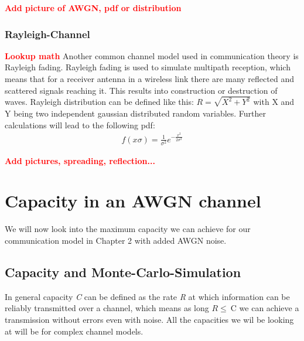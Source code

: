 \documentclass[12pt,oneside, reqno]{report}
\newcommand\boldred[1]{\textcolor{red}{\textbf{#1}}}
\begin{document}
\boldred{Add picture of AWGN, pdf or distribution}

\subsection{Rayleigh-Channel}
\boldred{Lookup math}
Another common channel model used in communication theory is Rayleigh fading. Rayleigh fading is used to simulate multipath reception, which means that for a receiver antenna in a wireless link there are many reflected and scattered signals reaching it. This results into construction or destruction of waves. Rayleigh distribution can be defined like this: $R = \sqrt{X^2 + Y^2}$ with X and Y being two independent gaussian distributed random variables. Further calculations will lead to the following pdf:
\begin{gather*}
f(x\sigma) = \frac{1}{\sigma^2}e^{-\frac{x^2}{2\sigma^2}} 
\end{gather*} 

\boldred{Add pictures, spreading, reflection...}
	
\newpage
\chapter{Capacity in an AWGN channel}

We will now look into the maximum capacity we can achieve for our communication model in Chapter 2 with added AWGN noise.

\section{Capacity and Monte-Carlo-Simulation}

In general capacity \textit{C} can be defined as the rate \textit{R} at which information can be reliably transmitted over a channel, which means as long $R \leq \ $C we can achieve a transmission without errors even with noise. All the capacities we wil be looking at will be for complex channel models.
\end{document}
